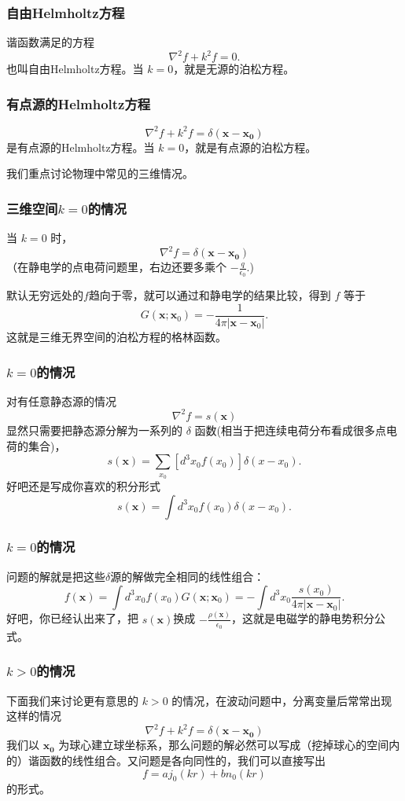 \documentclass[CJK]{beamer}
\begin{document}
\begin{frame}
 \frametitle{自由Helmholtz方程}
  谐函数满足的方程
  $$ \nabla^2f + k^2 f = 0. $$
  也叫自由Helmholtz方程。当 $k=0$，就是无源的泊松方程。
\end{frame}

\begin{frame}
 \frametitle{有点源的Helmholtz方程}
  $$ \nabla^2f + k^2 f = \delta(\mathbf{x}-\mathbf{x_0}) $$
 是有点源的Helmholtz方程。当 $k=0$，就是有点源的泊松方程。

 \skiplines
 
 我们重点讨论物理中常见的三维情况。
\end{frame}


\begin{frame}
  \frametitle{三维空间$k=0$的情况}
  当 $k=0$ 时，
  $$ \nabla^2f  = \delta(\mathbf{x}-\mathbf{x_0}) $$
  （在静电学的点电荷问题里，右边还要多乘个 $-\frac{q}{\epsilon_0}$.)

    默认无穷远处的$f$趋向于零，就可以通过和静电学的结果比较，得到 $f$ 等于
    $$ G(\mathbf{x};\mathbf{x}_0) = -\frac{1}{4\pi |\mathbf{x}-\mathbf{x}_0|} .$$
    这就是三维无界空间的泊松方程的格林函数。
\end{frame}


\begin{frame}
  \frametitle{$k=0$的情况}
  对有任意静态源的情况
    $$ \nabla^2f  = s(\mathbf{x})$$
  显然只需要把静态源分解为一系列的 $\delta$ 函数(相当于把连续电荷分布看成很多点电荷的集合)，
  $$ s(\mathbf{x}) = \sum_{x_0} [d^3x_0 f(x_0)] \delta(x-x_0). $$
  好吧还是写成你喜欢的积分形式
  $$ s(\mathbf{x}) = \int d^3x_0 f(x_0) \delta(x-x_0). $$  
\end{frame}

\begin{frame}
  \frametitle{$k=0$的情况}
  问题的解就是把这些$\delta$源的解做完全相同的线性组合：
  $$ f(\mathbf{x}) = \int d^3x_0f(x_0) G(\mathbf{x};\mathbf{x}_0) = -\int d^3x_0\frac{s(x_0)}{4\pi |\mathbf{x}-\mathbf{x}_0|}. $$
  好吧，你已经认出来了，把 $s(\mathbf{x})$换成 $-\frac{\rho(\mathbf{x})}{\epsilon_0}$，这就是电磁学的静电势积分公式。
\end{frame}


\begin{frame}
  \frametitle{$k>0$的情况}
  下面我们来讨论更有意思的 $k>0$ 的情况，在波动问题中，分离变量后常常出现这样的情况
  $$ \nabla^2f + k^2 f = \delta(\mathbf{x}-\mathbf{x_0}) $$
  我们以 $\mathbf{x_0}$ 为球心建立球坐标系，那么问题的解必然可以写成（挖掉球心的空间内的）谐函数的线性组合。又问题是各向同性的，我们可以直接写出
  $$ f = a j_0(kr) + b n_0(kr) $$
  的形式。
\end{frame}
\end{document}
